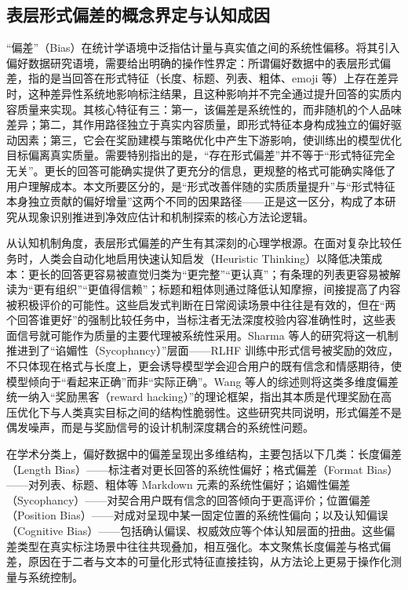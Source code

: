 \documentclass[9pt,a4paper,fontset=windows]{ctexart}
\theoremstyle{definition}
\numberwithin{equation}{section}
\begin{document}
\subsection{表层形式偏差的概念界定与认知成因}
“偏差”（Bias）在统计学语境中泛指估计量与真实值之间的系统性偏移。将其引入偏好数据研究语境，需要给出明确的操作性界定：所谓偏好数据中的表层形式偏差，指的是当回答在形式特征（长度、标题、列表、粗体、emoji 等）上存在差异时，这种差异性系统地影响标注结果，且这种影响并不完全通过提升回答的实质内容质量来实现。其核心特征有三：第一，该偏差是系统性的，而非随机的个人品味差异；第二，其作用路径独立于真实内容质量，即形式特征本身构成独立的偏好驱动因素；第三，它会在奖励建模与策略优化中产生下游影响，使训练出的模型优化目标偏离真实质量。需要特别指出的是，“存在形式偏差”并不等于“形式特征完全无关”。更长的回答可能确实提供了更充分的信息，更规整的格式可能确实降低了用户理解成本。本文所要区分的，是“形式改善伴随的实质质量提升”与“形式特征本身独立贡献的偏好增量”这两个不同的因果路径——正是这一区分，构成了本研究从现象识别推进到净效应估计和机制探索的核心方法论逻辑。

从认知机制角度，表层形式偏差的产生有其深刻的心理学根源。在面对复杂比较任务时，人类会自动化地启用快速认知启发（Heuristic Thinking）以降低决策成本：更长的回答更容易被直觉归类为“更完整”“更认真”；有条理的列表更容易被解读为“更有组织”“更值得信赖”；标题和粗体则通过降低认知摩擦，间接提高了内容被积极评价的可能性。这些启发式判断在日常阅读场景中往往是有效的，但在“两个回答谁更好”的强制比较任务中，当标注者无法深度校验内容准确性时，这些表面信号就可能作为质量的主要代理被系统性采用。Sharma 等人的研究将这一机制推进到了“谄媚性（Sycophancy）”层面——RLHF 训练中形式信号被奖励的效应，不只体现在格式与长度上，更会诱导模型学会迎合用户的既有信念和情感期待，使模型倾向于“看起来正确”而非“实际正确”。Wang 等人的综述则将这类多维度偏差统一纳入“奖励黑客（reward hacking）”的理论框架，指出其本质是代理奖励在高压优化下与人类真实目标之间的结构性脆弱性。这些研究共同说明，形式偏差不是偶发噪声，而是与奖励信号的设计机制深度耦合的系统性问题。

在学术分类上，偏好数据中的偏差呈现出多维结构，主要包括以下几类：长度偏差（Length Bias）——标注者对更长回答的系统性偏好；格式偏差（Format Bias）——对列表、标题、粗体等 Markdown 元素的系统性偏好；谄媚性偏差（Sycophancy）——对契合用户既有信念的回答倾向于更高评价；位置偏差（Position Bias）——对成对呈现中某一固定位置的系统性偏向；以及认知偏误（Cognitive Bias）——包括确认偏误、权威效应等个体认知层面的扭曲。这些偏差类型在真实标注场景中往往共现叠加，相互强化。本文聚焦长度偏差与格式偏差，原因在于二者与文本的可量化形式特征直接挂钩，从方法论上更易于操作化测量与系统控制。
\end{document}
